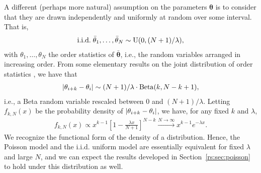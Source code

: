 A different (perhaps more natural) assumption on the parameters $\bm{\theta}$ is to consider that they are drawn independently and uniformly at random over some interval.
That is,
\begin{align*}
\text{i.i.d.}\; \bar{\theta}_1, \ldots, \bar{\theta}_N \sim \mathrm{U}( 0, (N+1) / \lambda ),
\end{align*}
with $\theta_1, \ldots, \theta_N$ the order statistics of $\bar{\bm{\theta}}$, i.e., the random variables arranged in increasing order.
From some elementary results on the joint distribution of order statistics \citep[see, e.g.,][]{arnold2008first}, we have that
\begin{align*}
\lvert\theta_{i+k} - \theta_{i}\rvert \sim (N+1) / \lambda \cdot \mathrm{Beta}( k, N - k + 1 ),
\end{align*}
i.e., a Beta random variable rescaled between $0$ and $(N+1) / \lambda$.
Letting $f_{k,N}(x)$ be the probability density of $\lvert\theta_{i+k} - \theta_{i}\rvert$, we have, for any fixed $k$ and $\lambda$,
\begin{align*}
f_{k,N}(x) \propto x^{k-1} \left[ 1 - \frac{\lambda x}{N + 1} \right]^{N - k} \xrightarrow{N \to \infty} x^{k-1} e^{-\lambda x}.
\end{align*}
We recognize the functional form of the density of a  distribution.
Hence, the Poisson model and the i.i.d. uniform model are essentially equivalent for fixed $\lambda$ and large $N$, and we can expect the results developed in Section~\ref{rs:sec:poisson} to hold under this distribution as well.
